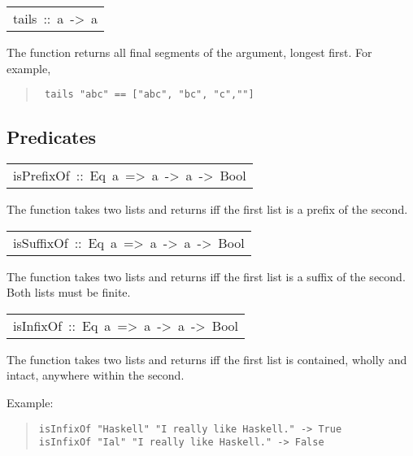 \begin{haddockdesc}
\item[\begin{tabular}{@{}l}
tails\ ::\ {\char 91}a{\char 93}\ ->\ {\char 91}{\char 91}a{\char 93}{\char 93}
\end{tabular}]\haddockbegindoc
The  function returns all final segments of the argument,
 longest first.  For example,
\par
\begin{quote}
{\haddockverb\begin{verbatim}
 tails "abc" == ["abc", "bc", "c",""]
\end{verbatim}}
\end{quote}

\end{haddockdesc}
\subsection{Predicates
}
\begin{haddockdesc}
\item[\begin{tabular}{@{}l}
isPrefixOf\ ::\ Eq\ a\ =>\ {\char 91}a{\char 93}\ ->\ {\char 91}a{\char 93}\ ->\ Bool
\end{tabular}]\haddockbegindoc
The  function takes two lists and returns 
 iff the first list is a prefix of the second.
\par

\end{haddockdesc}
\begin{haddockdesc}
\item[\begin{tabular}{@{}l}
isSuffixOf\ ::\ Eq\ a\ =>\ {\char 91}a{\char 93}\ ->\ {\char 91}a{\char 93}\ ->\ Bool
\end{tabular}]\haddockbegindoc
The  function takes two lists and returns 
 iff the first list is a suffix of the second.
 Both lists must be finite.
\par

\end{haddockdesc}
\begin{haddockdesc}
\item[\begin{tabular}{@{}l}
isInfixOf\ ::\ Eq\ a\ =>\ {\char 91}a{\char 93}\ ->\ {\char 91}a{\char 93}\ ->\ Bool
\end{tabular}]\haddockbegindoc
The  function takes two lists and returns 
 iff the first list is contained, wholly and intact,
 anywhere within the second.
\par
Example:
\par
\begin{quote}
{\haddockverb\begin{verbatim}
isInfixOf "Haskell" "I really like Haskell." -> True
isInfixOf "Ial" "I really like Haskell." -> False
\end{verbatim}}
\end{quote}

\end{haddockdesc}
